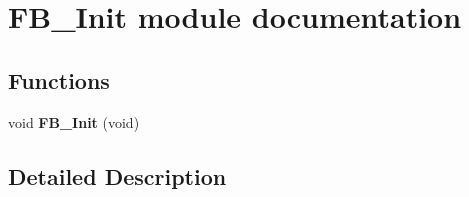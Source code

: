 \hypertarget{group___f_b___init__module}{}\section{F\+B\+\_\+\+Init module documentation}
\label{group___f_b___init__module}
\subsection*{Functions}
\begin{DoxyCompactItemize}
\item 
void {\bfseries F\+B\+\_\+\+Init} (void)\hypertarget{group___f_b___init__module_gae90af6e0e01226ac6174e8da438885e5}{}\label{group___f_b___init__module_gae90af6e0e01226ac6174e8da438885e5}

\end{DoxyCompactItemize}


\subsection{Detailed Description}
